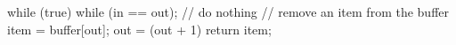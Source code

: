 \documentclass[varwidth=18.5em]{standalone}
\begin{document}
\begin{ccode}
while (true) {
  while (in == out); // do nothing 
  // remove an item from the buffer
  item = buffer[out];
  out = (out + 1) %
  return item;
}
\end{ccode}
\end{document}

